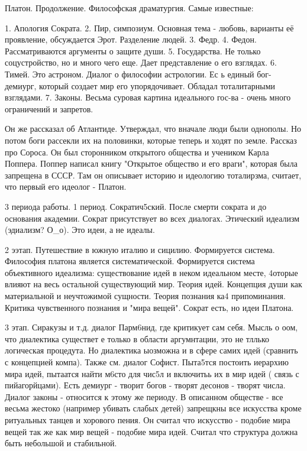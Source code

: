 Платон. Продолжение.
Философская драматургия.
Самые известные:

	1. Апология Сократа. 
	2. Пир, симпозиум. Основная тема - любовь, варианты её проявление, обсуждается Эрот. Разделение людей.
	3. Федр.
	4. Федон. Рассматриваются аргументы о защите души.
	5. Государства. Не только соцустройство, но и много чего еще. Дает представление о его взглядах.
	6. Тимей. Это астроном. Диалог о философии астрологии. Ес ь единый бог-демиург, который создает мир  его упорядочивает. Обладал тоталитарными взглядами.
	7. Законы. Весьма суровая картина идеального гос-ва - очень много ограничений и запретов.

Он же рассказал об Атлантиде. 
Утверждал, что вначале люди были однополы. Но потом боги рассекли их на половинки, которые теперь и ходят по земле.
Рассказ про Сороса. Он был сторонником открытого общества и учеником Карла Поппера. Поппер написал книгу "Открытое общество и его враги", которая была запрещена в СССР. Там он описывает историю и идеологию тоталирзма, считает, что первый его идеолог - Платон.

3 периода работы.
1 период. Сократич5ский. После смерти сократа и до основания академии. Сократ присутствует во всех диалогах. Этический идеализм (эдиализм? О_о). Это идеи, а не идеалы.

2 ээтап. Путешествие в южную италию и сицилию. Формируется система. Философия платона является систематической. Формируется система объективного идеализма: существование идей в неком идеальном месте, 4оторые влияют на весь остальной существующий мир. Теория идей. Концепция души как материальной и неучтожимой сущности. Теория познания ка4 припоминания. Критика чувственного познания и "мира вещей". Сократ есть, но идеи Платона.

3 этап. Сиракузы и т.д. диалог Парм6нид, где критикует сам себя. Мысль о оом, что диалектика существет е только в области аргумнтации, это не тллько логическая процедута. Но диалектика ыозможна и в сфере самих идей (сравнить с концепцией компа). Также см. диалог Софист. Пыта5тся постоить иерархию мира идей, пытаатся найти м6сто для чис5л и включитьь их в мир идей ( связь с пийагорйцами). Есть демиург - творит богов - творят десонов - творят числа. Диалог законы - относится к этому же периоду. В описанном обществе - все весьма жестоко (например убивать слабых детей) запрещкны все искусства кроме ритуальных танцев и хорового пения. Он считал что искусство - подобие мира вещей так же как мир вещей - подобие мира идей. Считал что структура должна быть небольшой и стабильной.

